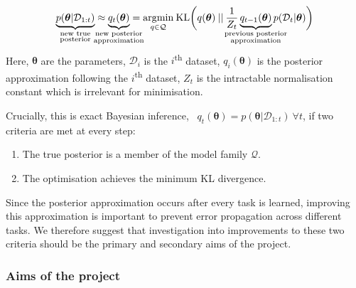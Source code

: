 \documentclass[a4paper,11=0pt]{article}
\let\boldtheta\theta %
\renewcommand{\theta}{\boldsymbol{\boldtheta}} %
\begin{document}
\vspace{-1.7em}
\begin{equation}\label{eq:3}
\begin{split}
\underbrace{p(\theta | \mathcal{D}_{1:t})}_{\mathclap{\substack{\text{new true}\\ \text{posterior}}}}\approx \underbrace{q_t(\theta)}_{\mathclap{\substack{\text{new posterior}\\ \text{approximation}}}} &=\underset{q\in\mathcal{Q}}{\mathrm{arg}\mathrm{min}} \: \mathrm{KL}\bigg(q(\theta)\:||\:\frac{1}{Z_t}\underbrace{q_{t-1}(\theta)}_{\mathclap{\substack{\text{previous posterior} \\ \text{approximation}}}}p(\mathcal{D}_t|\theta) \bigg)\\
\end{split}
\end{equation}
Here, $\theta$ are the parameters, $\mathcal{D}_i$ is the $i$\textsuperscript{th} dataset, $q_i(\theta)$ is the posterior approximation following the $i$\textsuperscript{th} dataset, $Z_t$ is the intractable normalisation constant which is irrelevant for minimisation.

Crucially, this is exact Bayesian inference, \ $q_t(\theta)=p(\theta | \mathcal{D}_{1:t}) \: \forall t$, if two criteria are met at every step:

\begin{enumerate}
\item The true posterior is a member of the model family $\mathcal{Q}$.
\item The optimisation achieves the minimum KL divergence.

\end{enumerate}

Since the posterior approximation occurs after every task is learned, improving this approximation is important to prevent error propagation across different tasks. We therefore suggest that investigation into improvements to these two criteria should be the primary and secondary aims of the project.

\vspace{-1em}
\subsubsection*{Aims of the project}
\end{document}
